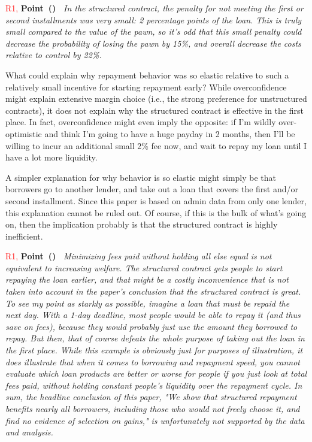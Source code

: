 \documentclass[11pt, colorinlistoftodos]{article} %
\newcounter{point}
\def\thepoint{\alph{point}}
\newenvironment{point}{\refstepcounter{point}\noindent\textbf{Point~(\thepoint)~}\hrulefill\newline\itshape\small}{\par\vspace{-1.25em}\noindent\hrulefill}
\begin{document}
\vspace{.2in}
\textcolor{red}{R1, }\begin{point} 
In the structured contract, the penalty for not meeting the first or second installments was very small: 2 percentage points of the loan. This is truly small compared to the value of the pawn, so it's odd that this small penalty could decrease the probability of losing the pawn by 15\%, and overall decrease the costs relative to control by 22\%.

What could explain why repayment behavior was so elastic relative to such a relatively small incentive for starting repayment early? While overconfidence might explain extensive margin choice (i.e., the strong preference for unstructured contracts), it does not explain why the structured contract is effective in the first place. In fact, overconfidence might even imply the opposite: if I'm wildly over-optimistic and think I'm going to have a huge payday in 2 months, then I'll be willing to incur an additional small 2\% fee now, and wait to repay my loan until I have a lot more liquidity.

A simpler explanation for why behavior is so elastic might simply be that borrowers go to another lender, and take out a loan that covers the first and/or second installment. Since this paper is based on admin data from only one lender, this explanation cannot be ruled out. Of course, if this is the bulk of what's going on, then the implication probably is that the structured contract is highly inefficient.

\end{point}



\vspace{.2in}
\textcolor{red}{R1, }\begin{point} 
Minimizing fees paid without holding all else equal is not equivalent to increasing welfare. The structured contract gets people to start repaying the loan earlier, and that might be a costly inconvenience that is not taken into account in the paper's conclusion that the structured contract is great. To see my point as starkly as possible, imagine a loan that must be repaid the next day. With a 1-day deadline, most people would be able to repay it (and thus save on fees), because they would probably just use the amount they borrowed to repay. But then, that of course defeats the whole purpose of taking out the loan in the first place. While this example is obviously just for purposes of illustration, it does illustrate that when it comes to borrowing and repayment speed, you cannot evaluate which loan products are better or worse for people if you just look at total fees paid, without holding constant people's liquidity over the repayment cycle.
In sum, the headline conclusion of this paper, "We show that structured repayment benefits nearly all borrowers, including those who would not freely choose it, and find no evidence of selection on gains," is unfortunately not supported by the data and analysis.
\end{point}
\end{document}
